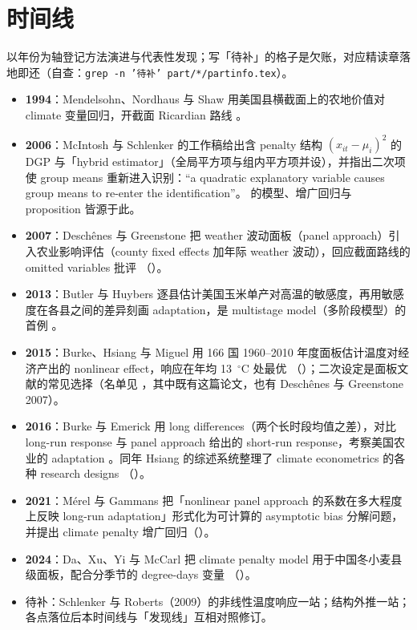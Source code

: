 \section{时间线}

以年份为轴登记方法演进与代表性发现；写「待补」的格子是欠账，对应精读章落地即还（自查：\texttt{grep -n '待补' part/*/partinfo.tex}）。

\begin{itemize}
  \item \textbf{1994}：Mendelsohn、Nordhaus 与 Shaw 用美国县横截面上的农地价值对 climate 变量回归，开截面 Ricardian 路线 \citep{mendelsohn1994impact}。
  \item \textbf{2006}：McIntosh 与 Schlenker 的工作稿给出含 penalty 结构 $(x_{it}-\mu_i)^2$ 的 DGP 与「hybrid estimator」（全局平方项与组内平方项并设），并指出二次项使 group means 重新进入识别：``a quadratic explanatory variable causes group means to re-enter the identification''\citep[摘要页；模型见第~4 页、hybrid estimator 见第~5--6 页]{mcintosh2006identifying}。 的模型、增广回归与 proposition 皆源于此。
  \item \textbf{2007}：Deschênes 与 Greenstone 把 weather 波动面板（panel approach）引入农业影响评估（county fixed effects 加年际 weather 波动），回应截面路线的 omitted variables 批评 \citep{deschenes2007economic}（）。
  \item \textbf{2013}：Butler 与 Huybers 逐县估计美国玉米单产对高温的敏感度，再用敏感度在各县之间的差异刻画 adaptation，是 multistage model（多阶段模型）的首例 \citep{butler2013adaptation}。
  \item \textbf{2015}：Burke、Hsiang 与 Miguel 用 166 国 1960--2010 年度面板估计温度对经济产出的 nonlinear effect，响应在年均 13~$^\circ$C 处最优 \citep{burke2015global}（）；二次设定是面板文献的常见选择（名单见 \citealp[第~1208 页脚注~3]{merel2021climate}，其中既有这篇论文，也有 Deschênes 与 Greenstone 2007）。
  \item \textbf{2016}：Burke 与 Emerick 用 long differences（两个长时段均值之差），对比 long-run response 与 panel approach 给出的 short-run response，考察美国农业的 adaptation \citep{burke2016adaptation}。同年 Hsiang 的综述系统整理了 climate econometrics 的各种 research designs \citep{hsiang2016climate}（）。
  \item \textbf{2021}：Mérel 与 Gammans 把「nonlinear panel approach 的系数在多大程度上反映 long-run adaptation」形式化为可计算的 asymptotic bias 分解问题，并提出 climate penalty 增广回归（）。
  \item \textbf{2024}：Da、Xu、Yi 与 McCarl 把 climate penalty model 用于中国冬小麦县级面板，配合分季节的 degree-days 变量 \citep{da2024climate}（）。
  \item 待补：Schlenker 与 Roberts（2009）的非线性温度响应一站；结构外推一站；各点落位后本时间线与「发现线」互相对照修订。
\end{itemize}

